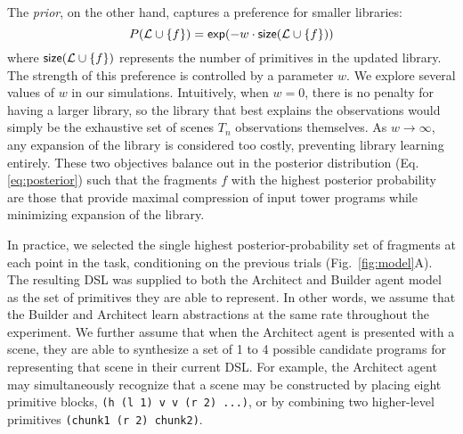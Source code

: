 \documentclass[10pt,letterpaper]{article}
\begin{document}
The \emph{prior}, on the other hand, captures a preference for smaller libraries:
\begin{equation*}
   P(\mathcal{L} \cup \{f\}) = \mathsf{exp}(- w \cdot \mathsf{size}(\mathcal{L} \cup \{f\}))
\end{equation*}
where $\mathsf{size}(\mathcal{L} \cup \{f\})$ represents the number of primitives in the updated library. 
The strength of this preference is controlled by a parameter $w$.
We explore several values of $w$ in our simulations. 
Intuitively, when $w=0$, there is no penalty for having a larger library, so the library that best explains the observations would simply be the exhaustive set of scenes $T_n$ observations themselves.
As $w \rightarrow \infty$, any expansion of the library is considered too costly, preventing library learning entirely. 
These two objectives balance out in the posterior distribution (Eq. \ref{eq:posterior}) such that the fragments $f$ with the highest posterior probability are those that provide maximal compression of input tower programs while minimizing expansion of the library.

In practice, we selected the single highest posterior-probability set of fragments at each point in the task, conditioning on the previous trials (Fig.~\ref{fig:model}A).
The resulting DSL was supplied to both the Architect and Builder agent model as the set of primitives they are able to represent.
In other words, we assume that the Builder and Architect learn abstractions at the same rate throughout the experiment.
We further assume that when the Architect agent is presented with a scene, they are able to synthesize a set of 1 to 4 possible candidate programs for representing that scene in their current DSL. 
For example, the Architect agent may simultaneously recognize that a scene may be constructed by placing eight primitive blocks, \texttt{(h (l 1) v v (r 2) ...)}, or by combining two higher-level primitives \texttt{(chunk1 (r 2) chunk2)}. 

\end{document}
